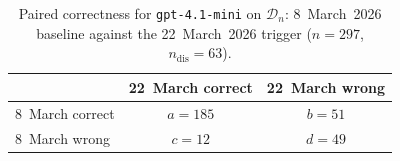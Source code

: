 \begin{table}[htbp]
    \centering
    \caption{Paired correctness for \texttt{gpt-4.1-mini} on
    $\mathcal{D}_n$: 8~March~2026 baseline against the 22~March~2026
    trigger ($n=297$, $n_{\mathrm{dis}}=63$).}
    \label{tab:contingency-trigger}
    \begin{tabular}{lcc}
    \toprule
     & 22~March correct & 22~March wrong \\
    \midrule
    8~March correct & $a=185$ & $b=51$ \\
    8~March wrong   & $c=12$ & $d=49$ \\
    \bottomrule
    \end{tabular}
\end{table}
